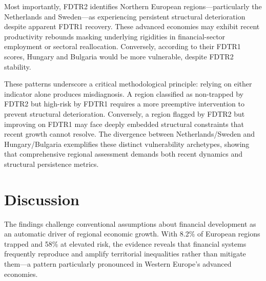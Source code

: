 \documentclass[a4paper,11pt,oneside]{article}
\begin{document}
Most importantly, FDTR2 identifies Northern European regions---particularly the Netherlands and Sweden---as experiencing persistent structural deterioration despite apparent FDTR1 recovery. These advanced economies may exhibit recent productivity rebounds masking underlying rigidities in financial-sector employment or sectoral reallocation. Conversely, according to their FDTR1 scores, Hungary and Bulgaria would be more vulnerable, despite FDTR2 stability. 




These patterns underscore a critical methodological principle: relying on either indicator alone produces misdiagnosis. A region classified as non-trapped by FDTR2 but high-risk by FDTR1 requires a more preemptive intervention to prevent structural deterioration. Conversely, a region flagged by FDTR2 but improving on FDTR1 may face deeply embedded structural constraints that recent growth cannot resolve. The divergence between Netherlands/Sweden and Hungary/Bulgaria exemplifies these distinct vulnerability archetypes, showing that comprehensive regional assessment demands both recent dynamics and structural persistence metrics. 





\section{Discussion}
\label{sec:discussion}

The findings challenge conventional assumptions about financial development as an automatic driver of regional economic growth. With 8.2\% of European regions trapped and 58\% at elevated risk, the evidence reveals that financial systems frequently reproduce and amplify territorial inequalities rather than mitigate them---a pattern particularly pronounced in Western Europe's advanced economies.
\end{document}
